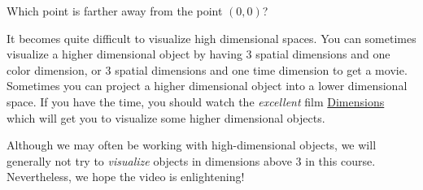 \documentclass{ximera}
\begin{document}
\begin{question}
  Which point is farther away from the point $(0,0)$?

  \begin{solution}
    \begin{hint}
    \end{hint}

    \begin{multiple-choice}
    \end{multiple-choice}    
  \end{solution}
\end{question}

It becomes quite difficult to visualize high dimensional spaces.  You
can sometimes visualize a higher dimensional object by having $3$
spatial dimensions and one color dimension, or $3$ spatial dimensions
and one time dimension to get a movie.  Sometimes you can project a
higher dimensional object into a lower dimensional space.  If you have
the time, you should watch the \textit{excellent} film
\href{http://www.dimensions-math.org/}{Dimensions} which will get you
to visualize some higher dimensional objects.


Although we may often be working with high-dimensional objects, we
will generally not try to \textit{visualize} objects in dimensions
above $3$ in this course.  Nevertheless, we hope the video is
enlightening!
\end{document}
